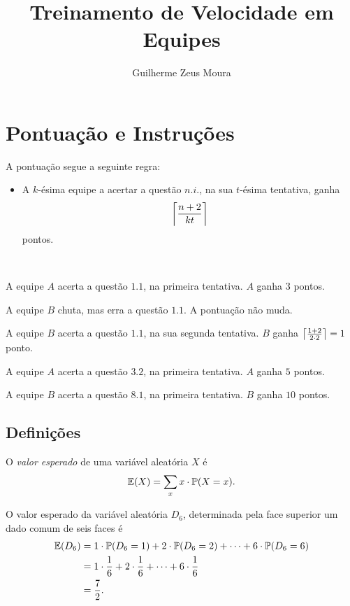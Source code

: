 \documentclass[10pt, a4paper]{article}
\title{Treinamento de Velocidade em Equipes}
\author{Guilherme Zeus Moura}
\begin{document}
	
	\zeustitle

	\setcounter{section}{-1}

	\section{Pontuação e Instruções}
	
	A pontuação segue a seguinte regra:
	\begin{itemize}
		\item A $k$-ésima equipe a acertar a questão $n.i.$, na sua $t$-ésima tentativa, ganha
			\[\left \lceil{\frac{n+2}{kt}}\right \rceil\]
			pontos.
	\end{itemize}

	\begin{exmp}
		~

		A equipe $A$ acerta a questão $1.1$, na primeira tentativa. $A$ ganha $3$ pontos.

		A equipe $B$ chuta, mas erra a questão $1.1$. A pontuação não muda.

	A equipe $B$ acerta a questão $1.1$, na sua segunda tentativa. $B$ ganha $\left \lceil{\frac{1+2}{2\cdot 2}}\right \rceil = 1$ ponto.

		A equipe $A$ acerta a questão $3.2$, na primeira tentativa. $A$ ganha $5$ pontos.

		A equipe $B$ acerta a questão $8.1$, na primeira tentativa. $B$ ganha $10$ pontos.
	\end{exmp}

	\subsection{Definições}

	\begin{defn}
		O \emph{valor esperado} de uma variável aleatória $X$ é \[\mathbb{E}(X) = \sum_{x} x\cdot \mathbb{P}(X = x).\]
	\end{defn}

	\begin{exmp}
		O valor esperado da variável aleatória $D_6$, determinada pela face superior um dado comum de seis faces é 
	\begin{align*}
		\mathbb{E}(D_6) & = 1\cdot\mathbb{P}(D_6 = 1) + 2 \cdot \mathbb{P}(D_6 = 2) + \cdots + 6\cdot \mathbb{P}(D_6 = 6) \\
				 & = 1\cdot\frac{1}{6} + 2 \cdot \frac{1}{6} + \cdots + 6 \cdot \frac{1}{6} \\
				 & = \frac{7}{2}.
	\end{align*}
	\end{exmp}
\end{document}

